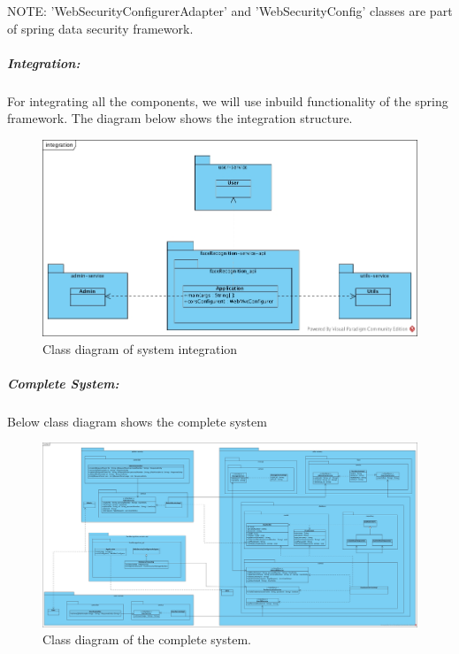 \documentclass[a4paper,11pt]{article}
\begin{document}
NOTE: 'WebSecurityConfigurerAdapter' and 'WebSecurityConfig' classes are part of spring data security framework.

\subparagraph{Integration: } For integrating all the components, we will use inbuild functionality of the spring framework. The diagram below shows the integration structure.

\begin{figure}[ht!]
    \centering
	\includegraphics[width=130mm]{ClassDiagrams/new/integration.jpg}
		\caption{Class diagram of system integration}
\end{figure}

\newpage
\subparagraph{Complete System: } Below class diagram shows the complete system

\begin{figure}[ht!]
    \centering
    \includegraphics[scale=0.18]{ClassDiagrams/new/system.jpg}
		\caption{Class diagram of the complete system.}
\end{figure}
\newpage
\end{document}
